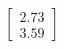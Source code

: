 \documentclass[preview]{standalone}
\begin{document}
\begin{align*}
\begin{bmatrix} 2.73 \\ 3.59 \end{bmatrix}
\end{align*}
\end{document}
